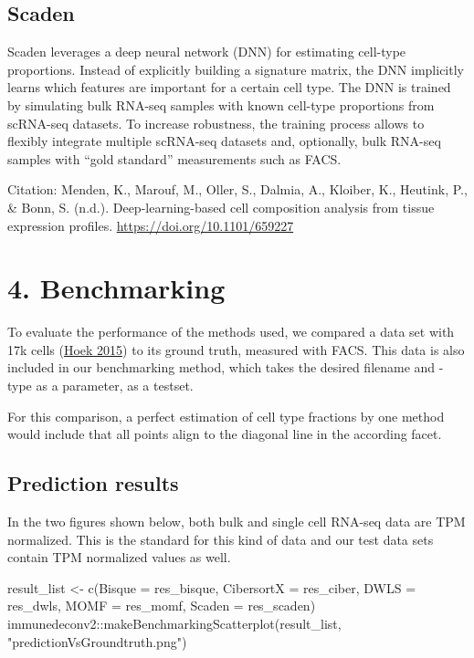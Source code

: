 \documentclass[
]{article}
\newenvironment{Shaded}{\begin{snugshade}}{\end{snugshade}}
\newcommand{\AttributeTok}[1]{\textcolor[rgb]{0.77,0.63,0.00}{#1}}
\newcommand{\FunctionTok}[1]{\textcolor[rgb]{0.00,0.00,0.00}{#1}}
\newcommand{\NormalTok}[1]{#1}
\newcommand{\OtherTok}[1]{\textcolor[rgb]{0.56,0.35,0.01}{#1}}
\newcommand{\SpecialCharTok}[1]{\textcolor[rgb]{0.00,0.00,0.00}{#1}}
\newcommand{\StringTok}[1]{\textcolor[rgb]{0.31,0.60,0.02}{#1}}
\begin{document}
\hypertarget{scaden}{%
\subsection{Scaden}\label{scaden}}

Scaden leverages a deep neural network (DNN) for estimating cell-type
proportions. Instead of explicitly building a signature matrix, the DNN
implicitly learns which features are important for a certain cell type.
The DNN is trained by simulating bulk RNA-seq samples with known
cell-type proportions from scRNA-seq datasets. To increase robustness,
the training process allows to flexibly integrate multiple scRNA-seq
datasets and, optionally, bulk RNA-seq samples with ``gold standard''
measurements such as FACS.

Citation: Menden, K., Marouf, M., Oller, S., Dalmia, A., Kloiber, K.,
Heutink, P., \& Bonn, S. (n.d.). Deep-learning-based cell composition
analysis from tissue expression profiles.
\url{https://doi.org/10.1101/659227}

\hypertarget{benchmarking}{%
\section{4. Benchmarking}\label{benchmarking}}

To evaluate the performance of the methods used, we compared a data set
with 17k cells (\protect\hyperlink{ref-Hoek2015}{Hoek 2015}) to its
ground truth, measured with FACS. This data is also included in our
benchmarking method, which takes the desired filename and -type as a
parameter, as a testset.

For this comparison, a perfect estimation of cell type fractions by one
method would include that all points align to the diagonal line in the
according facet.

\hypertarget{prediction-results}{%
\subsection{Prediction results}\label{prediction-results}}

In the two figures shown below, both bulk and single cell RNA-seq data
are TPM normalized. This is the standard for this kind of data and our
test data sets contain TPM normalized values as well.

\begin{Shaded}
\begin{Highlighting}[]
\NormalTok{result\_list }\OtherTok{\textless{}{-}} \FunctionTok{c}\NormalTok{(}\AttributeTok{Bisque =}\NormalTok{ res\_bisque, }\AttributeTok{CibersortX =}\NormalTok{ res\_ciber, }
    \AttributeTok{DWLS =}\NormalTok{ res\_dwls, }\AttributeTok{MOMF =}\NormalTok{ res\_momf, }\AttributeTok{Scaden =}\NormalTok{ res\_scaden)}
\NormalTok{immunedeconv2}\SpecialCharTok{::}\FunctionTok{makeBenchmarkingScatterplot}\NormalTok{(result\_list, }\StringTok{"predictionVsGroundtruth.png"}\NormalTok{)}
\end{Highlighting}
\end{Shaded}
\end{document}
